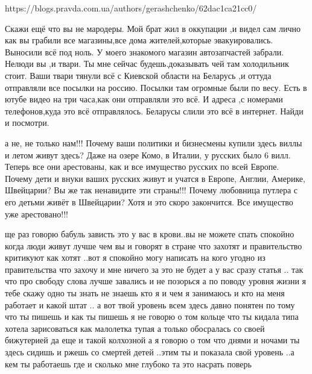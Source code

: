  
 
 
 
 

https://blogs.pravda.com.ua/authors/gerashchenko/62dac1ca21cc0/

Скажи ещё что вы не мародеры. Мой брат жил в оккупации ,и видел сам лично как
вы грабили все магазины,все дома жителей,которые эвакуировались. Выносили всё
под ноль. У моего знакомого магазин автозапчастей забрали. Нелюди вы ,и твари.
Ты мне сейчас будешь.доказывать чей там холодильник стоит. Ваши твари тянули
всё с Киевской области на Беларусь ,и оттуда отправляли все посылки на россию.
Посылки там огромные были по весу. Есть в ютубе видео на три часа,как они
отправляли это всё. И адреса ,с номерами телефонов,куда это всё отправлялось.
Беларусы слили это всё в интернет. Найди и посмотри.

а не, не только нам!!! Почему ваши политики и бизнесмены купили здесь виллы и
летом живут здесь? Даже на озере Комо, в Италии, у русских было 6 вилл. Теперь
все они арестованы, как и все имущество русских по всей Европе. Почему дети и
внуки ваших русских живут и учатся в Европе, Англии, Америке, Швейцарии? Вы же
так ненавидите эти страны!!! Почему любовница путлера с его детьми живёт в
Швейцарии? Хотя и это скоро закончится. Все имущество уже арестовано!!!

ще раз говорю бабуль зависть это у вас в крови..вы не можете спать спокойно
когда люди живут лучше чем вы и говорят в стране что захотят и правительство
критикуют как хотят ..вот я спокойно могу написать на кого угодно из
правительства что захочу и мне ничего за это не будет а у вас сразу статья ..
так что про свободу слова лучше завались и не позорься а по поводу уровня жизни
я тебе скажу одно ты знать не знаешь кто я и чем я занимаюсь и кто на меня
работает и какой штат .. а вот твой уровень всем здесь давно понятен по тому
что ты пишешь и как ты пишешь я не говорю о том кольце что ты кидала типа
хотела зарисоваться как малолетка тупая а только обосралась со своей бижутерией
да еще и такой колхозной а я говорю о том что днями и ночами ты здесь сидишь и
ржешь со смертей детей ..этим ты и показала свой уровень ..а кем ты работаешь
где и сколько мне глубоко та это насрать поверь

